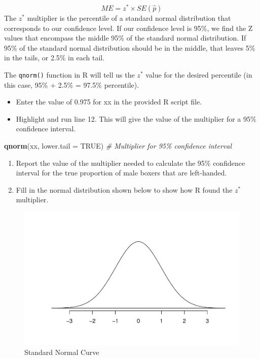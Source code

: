 \documentclass[
]{report}
\newenvironment{Shaded}{\begin{snugshade}}{\end{snugshade}}
\newcommand{\AttributeTok}[1]{\textcolor[rgb]{0.13,0.29,0.53}{#1}}
\newcommand{\CommentTok}[1]{\textcolor[rgb]{0.56,0.35,0.01}{\textit{#1}}}
\newcommand{\ConstantTok}[1]{\textcolor[rgb]{0.56,0.35,0.01}{#1}}
\newcommand{\FunctionTok}[1]{\textcolor[rgb]{0.13,0.29,0.53}{\textbf{#1}}}
\newcommand{\NormalTok}[1]{#1}
\begin{document}
\[ME = z^* \times SE(\hat{p})\]
The \(z^*\) multiplier is the percentile of a standard normal distribution that corresponds to our confidence level. If our confidence level is 95\%, we find the Z values that encompass the middle 95\% of the standard normal distribution. If 95\% of the standard normal distribution should be in the middle, that leaves 5\% in the tails, or 2.5\% in each tail.

The \texttt{qnorm()} function in R will tell us the \(z^*\) value for the desired percentile (in this case, 95\% + 2.5\% = 97.5\% percentile).

\begin{itemize}
\item
  Enter the value of 0.975 for xx in the provided R script file.
\item
  Highlight and run line 12. This will give the value of the multiplier for a 95\% confidence interval.
\end{itemize}

\begin{Shaded}
\begin{Highlighting}[]
\FunctionTok{qnorm}\NormalTok{(xx, }\AttributeTok{lower.tail =} \ConstantTok{TRUE}\NormalTok{) }\CommentTok{\# Multiplier for 95\% confidence interval}
\end{Highlighting}
\end{Shaded}

\begin{enumerate}
\def\labelenumi{\arabic{enumi}.}
\setcounter{enumi}{7}
\item
  Report the value of the multiplier needed to calculate the 95\% confidence interval for the true proportion of male boxers that are left-handed.
  \vspace{0.2in}
\item
  Fill in the normal distribution shown below to show how R found the \(z^*\) multiplier.
\end{enumerate}

\begin{figure}

{\centering \includegraphics[width=0.45\linewidth]{04-A10-confidenceLevel_files/figure-latex/Normalcur-1} 

}

\caption{Standard Normal Curve}\label{fig:Normalcur}
\end{figure}
\end{document}
